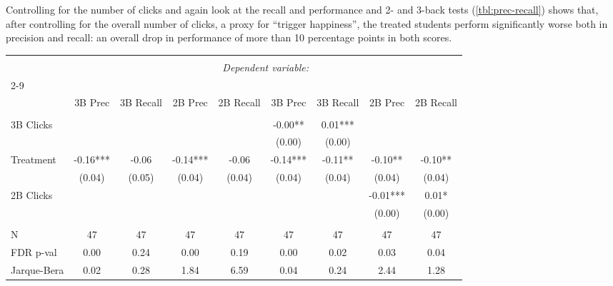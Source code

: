 \documentclass[a4paper,12pt]{article}
\begin{document}
Controlling for the number of clicks and again look at the recall and performance and 2- and 3-back tests (\ref{tbl:prec-recall}) shows that, after controlling for the overall number of clicks, a proxy for ``trigger happiness'', the treated students perform significantly worse both in precision and recall: an overall drop in performance of more than 10 percentage points in both scores. 


\begin{sidewaystable}
\caption{}
\label{tbl:prec-recall}
\begin{center}
\begin{tabular}{@{\extracolsep{5pt}}lcccccccc}
\hline
\hline \\
[-1.8ex] & \multicolumn{8}{c}{\textit{Dependent variable:}} \\
\cline{2-9} \\
[-1.8ex] & 3B Prec & 3B Recall & 2B Prec & 2B Recall & 3B Prec & 3B Recall & 2B Prec & 2B Recall  \\
\hline \\ [-1.8ex]
3B Clicks           &           &             &           &             & -0.00**    & 0.01***      &            &               \\
                             &           &             &           &             & (0.00)     & (0.00)       &            &               \\
Treatment                      & -0.16***  & -0.06       & -0.14***  & -0.06       & -0.14***   & -0.11**      & -0.10**    & -0.10**       \\
                             & (0.04)    & (0.05)      & (0.04)    & (0.04)      & (0.04)     & (0.04)       & (0.04)     & (0.04)        \\
2B Clicks             &           &             &           &             &            &              & -0.01***   & 0.01*         \\
                             &           &             &           &             &            &              & (0.00)     & (0.00)        \\
\hline \\[-1.8ex]
N                  & 47        & 47          & 47        & 47          & 47         & 47           & 47         & 47            \\
FDR p-val & 0.00      & 0.24        & 0.00      & 0.19        & 0.00       & 0.02         & 0.03       & 0.04          \\
Jarque-Bera                  & 0.02      & 0.28        & 1.84      & 6.59        & 0.04       & 0.24         & 2.44       & 1.28          \\

\end{tabular}
\end{center}
\end{sidewaystable}
\end{document}
